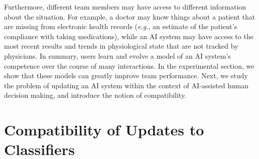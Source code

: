 \documentclass[letterpaper]{article} %
\newcommand{\eg}{\mbox{\it e.g.}}
\newcommand{\?}{\mbox{?}}
\begin{document}
Furthermore, different team members may have access to different information about the situation. 
For example, a doctor may know things about a patient that are missing from electronic health records (\eg, an estimate of the patient's compliance with taking medications), while an AI system may have access to the most recent results and trends in physiological state that are not tracked by physicians. 
In summary, users learn and evolve a model of an AI system's competence over the course of many interactions. In the experimental section, we show that these models can greatly improve team performance. Next, we study the problem of updating an AI system within the context of AI-assisted human decision making, and introduce the notion of compatibility.


\section{Compatibility of Updates to Classifiers}

\end{document}
